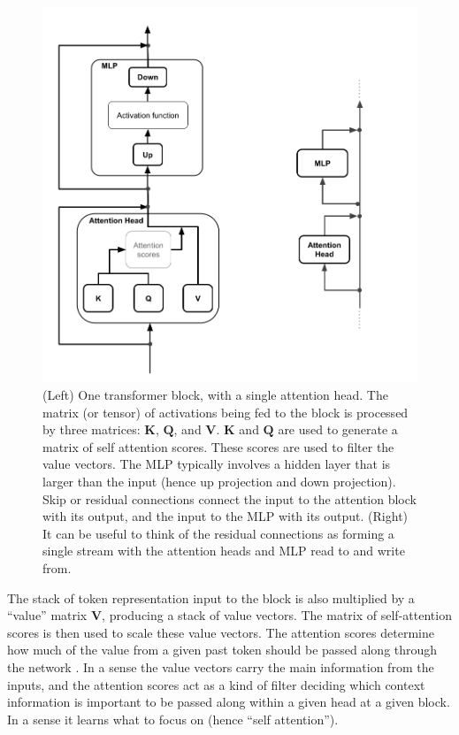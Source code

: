 \begin{figure}[ht]
\centering
\includegraphics[scale=.25]{./images/transformerBlockResidualStream.png}
\caption[Jeff Yoshimi and Pierre Beckman, with consultation from Tim Meyer.]{(Left) One transformer
block, with a single attention head. The matrix (or tensor) of activations being fed to
the block is processed by three matrices: $\textbf{K}$, $\textbf{Q}$, and
$\textbf{V}$.  $\textbf{K}$ and $\textbf{Q}$ are used to generate a
matrix of self attention scores. These scores are used to filter the value vectors. The MLP
typically involves a hidden layer that is larger than the input (hence up
projection and down projection). Skip or residual connections connect the input to the attention block with its output, and the input to the MLP with its output. (Right) It can be useful to think of the residual connections as forming a single stream with the attention heads and MLP read to and write from.}
\label{transformerBlockSimple}
\end{figure}

The stack of token representation input to the block is also multiplied by a ``value'' matrix $\textbf{V}$, producing a stack of value vectors. The matrix of self-attention scores is then used to scale these value vectors. The attention scores determine how much of the value from a given past token should be passed along through the network \cite{beckmann2025mechanistic}. In a sense the value vectors carry the main information from the inputs, and the attention scores act as a kind of filter deciding which context information is important to be passed along within a given head at a given block. In a sense it learns what to focus on (hence ``self attention'').

